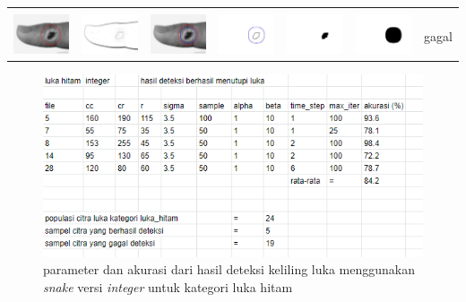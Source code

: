 \begin{table}[H]
\begin{tabular}{|m{0.7in}|m{0.7in}|m{0.7in}|m{0.7in}|m{0.7in}|m{0.7in}|m{0.7in}|}
		&  &  & & & &  \\
		\includegraphics[width=0.7in]{dataset/dataset_3/luka_merah/ready/44_integer_init.jpg}&
		\includegraphics[width=0.7in]{dataset/dataset_3/luka_merah/ready/44_integer_ext.jpg}&
		\includegraphics[width=0.7in]{dataset/dataset_3/luka_merah/ready/44_integer_result.jpg}&
		\includegraphics[width=0.7in]{dataset/dataset_3/luka_merah/ready/44_gt_r_integer.jpg}&
		\includegraphics[width=0.7in]{dataset/dataset_3/luka_merah/ready/44_r.jpg}&
		\includegraphics[width=0.7in]{dataset/dataset_3/luka_merah/ready/44_integer_r.jpg}&
		gagal\\
		\hline
	\end{tabular}
\end{table}

\begin{figure}[H]
	\centering
	\includegraphics[width=1\textwidth]{gambar/result_hitam_good}
	\caption{parameter dan akurasi dari hasil deteksi keliling luka menggunakan \emph{snake} versi \emph{integer} untuk kategori luka hitam}
	\label{Gambar:result_hitam_good}
\end{figure}

